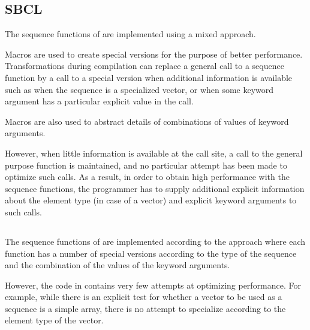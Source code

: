 \subsection{SBCL}

The sequence functions of \sbcl{} are implemented using a mixed
approach.

Macros are used to create special versions for the purpose of better
performance.  Transformations during compilation can replace a general
call to a sequence function by a call to a special version when
additional information is available such as when the sequence is a
specialized vector, or when some keyword argument has a particular
explicit value in the call.

Macros are also used to abstract details of combinations of values of
keyword arguments.

However, when little information is available at the call site, a call
to the general purpose function is maintained, and no particular
attempt has been made to optimize such calls.  As a result, in order
to obtain high performance with the \sbcl{} sequence functions, the
programmer has to supply additional explicit information about the
element type (in case of a vector) and explicit keyword arguments to
such calls.

\subsection{\ccl{}}

The sequence functions of \ccl{} are implemented according to the
approach where each function has a number of special versions
according to the type of the sequence and the combination of the
values of the keyword arguments.

However, the code in \ccl{} contains very few attempts at optimizing
performance.  For example, while there is an explicit test for whether
a vector to be used as a sequence is a simple array, there is no
attempt to specialize according to the element type of the vector.
